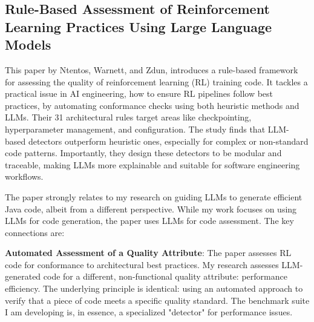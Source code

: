 \documentclass[11pt]{article}
\begin{document}

\subsection{Rule-Based Assessment of Reinforcement Learning Practices Using Large Language Models}

This paper by Ntentos, Warnett, and Zdun, introduces a rule-based framework for assessing the quality of reinforcement learning (RL) training code. It tackles a practical issue in AI engineering, how to ensure RL pipelines follow best practices, by automating conformance checks using both heuristic methods and LLMs. Their 31 architectural rules target areas like checkpointing, hyperparameter management, and configuration. The study finds that LLM-based detectors outperform heuristic ones, especially for complex or non-standard code patterns. Importantly, they design these detectors to be modular and traceable, making LLMs more explainable and suitable for software engineering workflows.

The paper strongly relates to my research on guiding LLMs to generate efficient Java code, albeit from a different perspective. While my work focuses on using LLMs for code generation, the paper uses LLMs for code assessment. The key connections are:

\textbf{Automated Assessment of a Quality Attribute}: The paper assesses RL code for conformance to architectural best practices. My research assesses LLM-generated code for a different, non-functional quality attribute: performance efficiency. The underlying principle is identical: using an automated approach to verify that a piece of code meets a specific quality standard. The benchmark suite I am developing is, in essence, a specialized "detector" for performance issues.
\end{document}
